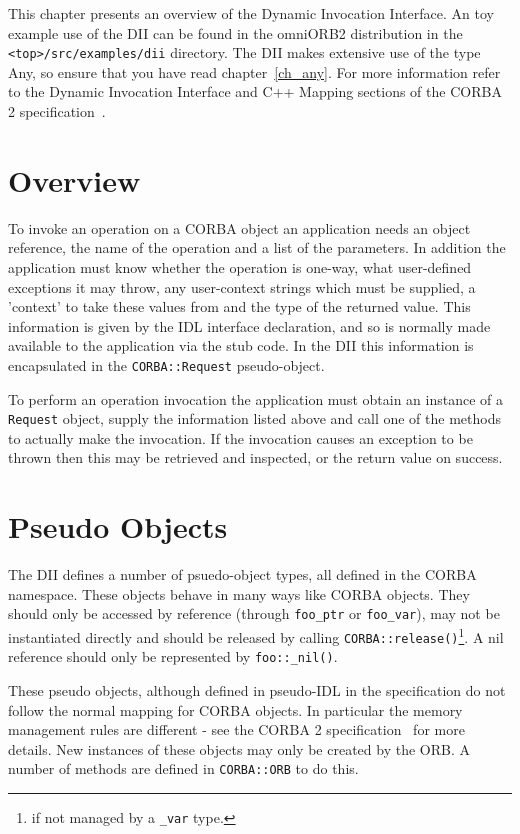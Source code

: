 \documentclass[11pt,twoside,onecolumn]{book}
\begin{document}
This chapter presents an overview of the Dynamic Invocation Interface.
An toy example use of the DII can be found in the omniORB2 distribution in
the {\tt <top>/src/examples/dii} directory.
The DII makes extensive use of the type Any, so ensure that you have read
chapter~\ref{ch_any}. For more information refer to the Dynamic Invocation
Interface and C++ Mapping sections of the CORBA 2
specification~\cite{corba2-spec}.


\section{Overview}

To invoke an operation on a CORBA object an application needs an object
reference, the name of the operation and a list of the parameters. In
addition the application must know whether the operation is one-way,
what user-defined exceptions it may throw, any user-context
strings which must be supplied, a 'context' to take these values from and the
type of the returned value. This
information is given by the IDL interface declaration, and so is normally
made available to the application via the stub code. In the DII this
information is encapsulated in the {\tt CORBA::Request} pseudo-object.

To perform an operation invocation the application must obtain an instance of
a {\tt Request} object, supply the information listed above and call one of
the methods to actually make the invocation. If the invocation causes an
exception to be thrown then this may be retrieved and inspected, or the
return value on success.


\section{Pseudo Objects}

The DII defines a number of psuedo-object types, all defined in the CORBA
namespace. These objects behave in many ways like CORBA objects. They
should only be accessed by reference (through {\tt foo\_ptr} or
{\tt foo\_var}), may not be
instantiated directly and should be released by calling
{\tt CORBA::release()}\footnote{if not managed by a {\tt \_var} type.}.
A nil reference should only be represented by {\tt foo::\_nil()}.

These pseudo objects, although defined in pseudo-IDL in the specification do
not follow the normal mapping for CORBA objects. In particular the memory
management rules are different - see the CORBA 2
specification~\cite{corba2-spec} for more details. New instances of these
objects may only be created by the ORB. A number of methods are defined
in {\tt CORBA::ORB} to do this.
\end{document}

